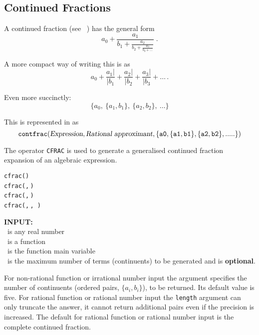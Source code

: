%
%
%
\subsection{Continued Fractions}

A continued fraction (see ~\cite{JonesThron:80}) has the general form
{\Large
\[a_0 + \frac{a_1}{b_1 +
         \frac{a_2}{b_2+
          \frac{a_3}{b_3 + \ldots
        }}}
\;.\]
}

A more compact way of writing this is as
\[a_0 + \frac{a_1|}{|b_1} + \frac{a_2|}{|b_2} + \frac{a_3|}{|b_3} + \ldots\,.\]

Even more succinctly:
\[\{a_0,\ \{a_1, b_1\},\ \{a_2, b_2\},\ \ldots\}\]

%
This is represented in {\REDUCE} as
\[{\tt
  contfrac(\textsl{Expression},
    \textsl{Rational approximant},
                \{a0, \{a1,b1\}, \{a2,b2\},.....\})
}\]

\hypertarget{CFRAC:operator}{}
The operator \texttt{CFRAC} is used to generate a generalised continued
fraction expansion of an algebraic expression.\\
\begin{syntaxtable}
  \texttt{cfrac(}\texttt{)}\\
  \texttt{cfrac(}\texttt{,}\,\texttt{)}\\
  \texttt{cfrac(}\texttt{,}\,\texttt{)}\\
  \texttt{cfrac(}\texttt{,}\,\texttt{,}\,%
  \texttt{)}
\end{syntaxtable}


\textbf{INPUT:}\\
 \ is any real number\\
 \ is a function\\
 \ is the function main variable\\
 \ is the maximum number of terms (continuents) to be
generated and is \textbf{optional}.

For non-rational function or irrational number input the 
argument specifies the number of continuents (ordered pairs, $\{a_i,b_i\}$),
to be returned. Its default value is five.
For rational function or rational number input the
\texttt{length} argument can only truncate the answer, it cannot
return additional pairs even if the precision is increased.
The default for rational function or rational number input is the
complete continued fraction.

